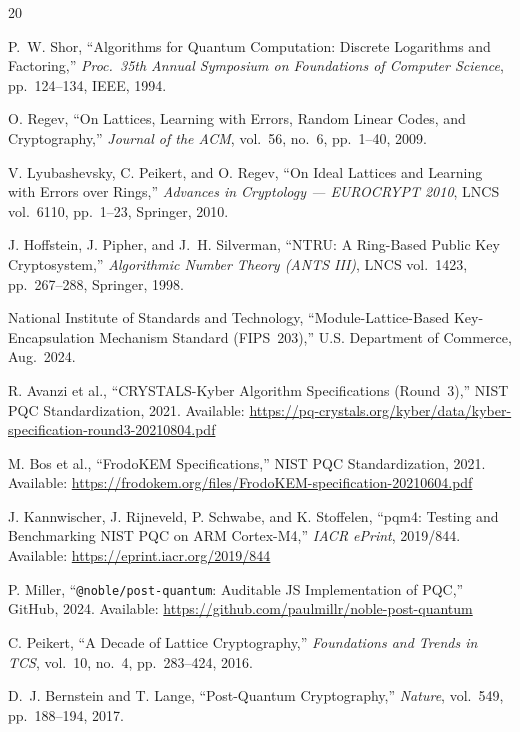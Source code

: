 \documentclass[11pt,a4paper]{article}
\begin{document}
\begin{thebibliography}{20}

P.~W. Shor, ``Algorithms for Quantum Computation: Discrete Logarithms and Factoring,'' \textit{Proc.~35th Annual Symposium on Foundations of Computer Science}, pp.~124--134, IEEE, 1994.

O. Regev, ``On Lattices, Learning with Errors, Random Linear Codes, and Cryptography,'' \textit{Journal of the ACM}, vol.~56, no.~6, pp.~1--40, 2009.

V. Lyubashevsky, C. Peikert, and O. Regev, ``On Ideal Lattices and Learning with Errors over Rings,'' \textit{Advances in Cryptology --- EUROCRYPT 2010}, LNCS vol.~6110, pp.~1--23, Springer, 2010.

J. Hoffstein, J. Pipher, and J.~H. Silverman, ``NTRU: A Ring-Based Public Key Cryptosystem,'' \textit{Algorithmic Number Theory (ANTS III)}, LNCS vol.~1423, pp.~267--288, Springer, 1998.

National Institute of Standards and Technology, ``Module-Lattice-Based Key-Encapsulation Mechanism Standard (FIPS~203),'' U.S. Department of Commerce, Aug.~2024.

R. Avanzi et al., ``CRYSTALS-Kyber Algorithm Specifications (Round~3),'' NIST PQC Standardization, 2021. Available: \url{https://pq-crystals.org/kyber/data/kyber-specification-round3-20210804.pdf}

M. Bos et al., ``FrodoKEM Specifications,'' NIST PQC Standardization, 2021. Available: \url{https://frodokem.org/files/FrodoKEM-specification-20210604.pdf}

J. Kannwischer, J. Rijneveld, P. Schwabe, and K. Stoffelen, ``pqm4: Testing and Benchmarking NIST PQC on ARM Cortex-M4,'' \textit{IACR ePrint}, 2019/844. Available: \url{https://eprint.iacr.org/2019/844}

P. Miller, ``\texttt{@noble/post-quantum}: Auditable JS Implementation of PQC,'' GitHub, 2024. Available: \url{https://github.com/paulmillr/noble-post-quantum}

C. Peikert, ``A Decade of Lattice Cryptography,'' \textit{Foundations and Trends in TCS}, vol.~10, no.~4, pp.~283--424, 2016.

D.~J. Bernstein and T. Lange, ``Post-Quantum Cryptography,'' \textit{Nature}, vol.~549, pp.~188--194, 2017.


\end{thebibliography}
\end{document}
